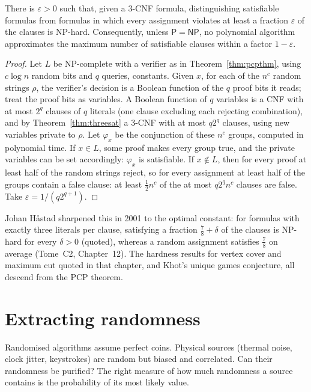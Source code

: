 \begin{corollary}\label{cor:max3sat}
There is $\varepsilon>0$ such that, given a 3-CNF formula, distinguishing satisfiable formulas from formulas in which every assignment violates at least a fraction $\varepsilon$ of the clauses is NP-hard. Consequently, unless $\mathsf P=\mathsf{NP}$, no polynomial algorithm approximates the maximum number of satisfiable clauses within a factor $1-\varepsilon$.
\end{corollary}

\begin{proof}
Let $L$ be NP-complete with a verifier as in Theorem~\ref{thm:pcpthm}, using $c\log n$ random bits and $q$ queries, constants. Given $x$, for each of the $n^c$ random strings $\rho$, the verifier's decision is a Boolean function of the $q$ proof bits it reads; treat the proof bits as variables. A Boolean function of $q$ variables is a CNF with at most $2^q$ clauses of $q$ literals (one clause excluding each rejecting combination), and by Theorem~\ref{thm:threesat} a 3-CNF with at most $q2^q$ clauses, using new variables private to $\rho$. Let $\varphi_x$ be the conjunction of these $n^c$ groups, computed in polynomial time. If $x\in L$, some proof makes every group true, and the private variables can be set accordingly: $\varphi_x$ is satisfiable. If $x\notin L$, then for every proof at least half of the random strings reject, so for every assignment at least half of the groups contain a false clause: at least $\frac12n^c$ of the at most $q2^qn^c$ clauses are false. Take $\varepsilon=1/(q2^{q+1})$.
\end{proof}

Johan Håstad sharpened this in 2001 to the optimal constant: for formulas with exactly three literals per clause, satisfying a fraction $\frac78+\delta$ of the clauses is NP-hard for every $\delta>0$ (quoted), whereas a random assignment satisfies $\frac78$ on average (Tome~C2, Chapter~12). The hardness results for vertex cover and maximum cut quoted in that chapter, and Khot's unique games conjecture, all descend from the PCP theorem.

\section{Extracting randomness}\label{sec:extractors}

Randomised algorithms assume perfect coins. Physical sources (thermal noise, clock jitter, keystrokes) are random but biased and correlated. Can their randomness be purified? The right measure of how much randomness a source contains is the probability of its most likely value.

